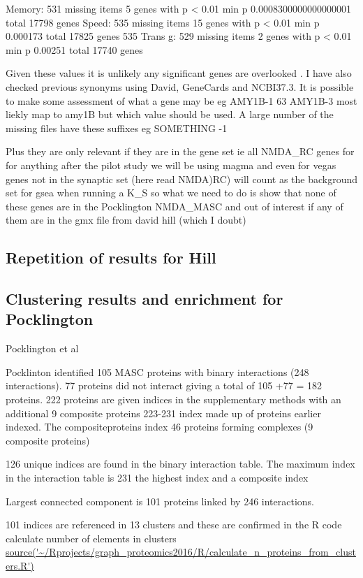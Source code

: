 Memory: 531 missing items 5 genes with p < 0.01 min p 0.0008300000000000001 total 17798 genes
Speed: 535 missing items 15 genes with p < 0.01 min p 0.000173 total 17825 genes 535
Trans g: 529 missing items 2 genes with p < 0.01 min p 0.00251 total 17740 genes


Given these values it is unlikely any significant genes are overlooked . I have also checked previous synonyms using David, GeneCards and NCBI37.3. It is possible to make some assessment of what a gene may be eg AMY1B-1
63            AMY1B-3 most liekly map to amy1B but which value should be used. A large number of the missing files have these suffixes eg SOMETHING -1

Plus they are only relevant if they are in the gene set ie all NMDA\_RC genes for for anything after the pilot study we will be using magma and even for vegas genes not in the synaptic set (here read NMDA)RC) will count as the background set for gsea when running a K\_S so what we need to do is show that none of these genes are in the Pocklington NMDA\_MASC and out of interest if any of them are in the gmx file from david hill (which I doubt)
\subsection{Repetition of results for Hill}
\subsection{Clustering results and enrichment for Pocklington}
Pocklington et al

Pocklinton identified 105 MASC proteins with binary interactions (248 interactions). 77 proteins did not interact giving a total of 105 +77 = 182 proteins. 222 proteins are given indices in the supplementary methods with an additional 9 composite proteins 223-231 index made up of proteins earlier indexed. The compositeproteins index 46 proteins forming complexes (9 composite proteins)

126 unique indices are found in the binary interaction table. The maximum index in the interaction table is 231 the highest index and a composite index

Largest connected component is 101 proteins linked by 246 interactions. 

101 indices are referenced in 13 clusters and these are confirmed in the R code calculate number of elements in clusters \url{source('~/Rprojects/graph_proteomics2016/R/calculate_n_proteins_from_clusters.R')}

